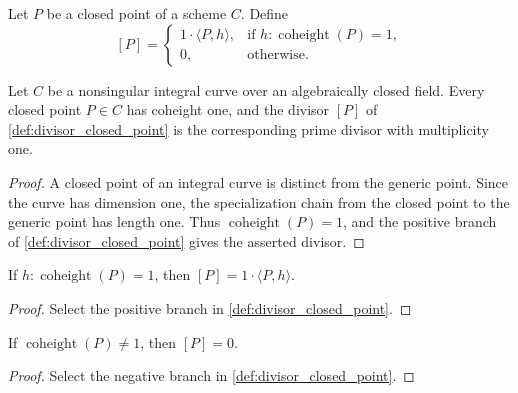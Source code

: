 \begin{definition}
  \label{def:divisor_closed_point}
  \leanok

  Let \(P\) be a closed point of a scheme \(C\).  Define
  \[
    [P]=
    \begin{cases}
      1\cdot\langle P,h\rangle,&
        \text{if }h:\operatorname{coheight}(P)=1,\\
      0,&\text{otherwise.}
    \end{cases}
  \]
\end{definition}

\begin{lemma}
  \label{lem:curve_closed_point_prime_divisor}

  Let \(C\) be a nonsingular integral curve over an algebraically closed
  field.  Every closed point \(P\in C\) has coheight one, and the divisor
  \([P]\) of \cref{def:divisor_closed_point} is the corresponding prime
  divisor with multiplicity one.
\end{lemma}
\begin{proof}
  A closed point of an integral curve is distinct from the generic point.
  Since the curve has dimension one, the specialization chain from the
  closed point to the generic point has length one.  Thus
  \(\operatorname{coheight}(P)=1\), and the positive branch of
  \cref{def:divisor_closed_point} gives the asserted divisor.
\end{proof}

\begin{lemma}
  \label{lem:ofClosedPoint_eq_single}
  \leanok

  If \(h:\operatorname{coheight}(P)=1\), then
  \([P]=1\cdot\langle P,h\rangle\).
\end{lemma}
\begin{proof}
  \leanok
  Select the positive branch in \cref{def:divisor_closed_point}.
\end{proof}

\begin{lemma}
  \label{lem:ofClosedPoint_eq_zero}
  \leanok

  If \(\operatorname{coheight}(P)\neq1\), then \([P]=0\).
\end{lemma}
\begin{proof}
  \leanok
  Select the negative branch in \cref{def:divisor_closed_point}.
\end{proof}

